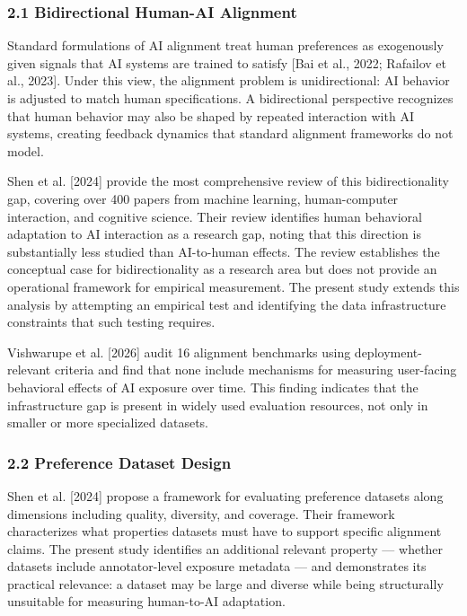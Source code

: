 
\subsubsection{2.1 Bidirectional Human-AI Alignment}

Standard formulations of AI alignment treat human preferences as exogenously given signals that AI systems are trained to satisfy [Bai et al., 2022; Rafailov et al., 2023]. Under this view, the alignment problem is unidirectional: AI behavior is adjusted to match human specifications. A bidirectional perspective recognizes that human behavior may also be shaped by repeated interaction with AI systems, creating feedback dynamics that standard alignment frameworks do not model.

Shen et al. [2024] provide the most comprehensive review of this bidirectionality gap, covering over 400 papers from machine learning, human-computer interaction, and cognitive science. Their review identifies human behavioral adaptation to AI interaction as a research gap, noting that this direction is substantially less studied than AI-to-human effects. The review establishes the conceptual case for bidirectionality as a research area but does not provide an operational framework for empirical measurement. The present study extends this analysis by attempting an empirical test and identifying the data infrastructure constraints that such testing requires.

Vishwarupe et al. [2026] audit 16 alignment benchmarks using deployment-relevant criteria and find that none include mechanisms for measuring user-facing behavioral effects of AI exposure over time. This finding indicates that the infrastructure gap is present in widely used evaluation resources, not only in smaller or more specialized datasets.

\subsubsection{2.2 Preference Dataset Design}

Shen et al. [2024] propose a framework for evaluating preference datasets along dimensions including quality, diversity, and coverage. Their framework characterizes what properties datasets must have to support specific alignment claims. The present study identifies an additional relevant property — whether datasets include annotator-level exposure metadata — and demonstrates its practical relevance: a dataset may be large and diverse while being structurally unsuitable for measuring human-to-AI adaptation.

